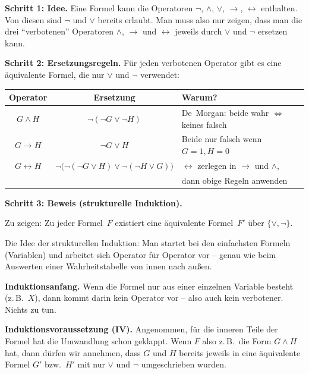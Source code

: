 \documentclass[a4paper,12pt]{article}
\begin{document}
\medskip
\textbf{Schritt 1: Idee.}
Eine Formel kann die Operatoren $\neg$, $\wedge$, $\vee$, $\to$,
$\leftrightarrow$ enthalten. Von diesen sind $\neg$ und $\vee$
bereits erlaubt. Man muss also nur zeigen, dass man die drei
``verbotenen'' Operatoren $\wedge$, $\to$ und $\leftrightarrow$
jeweils durch $\vee$ und $\neg$ ersetzen kann.

\medskip
\textbf{Schritt 2: Ersetzungsregeln.}
F\"ur jeden verbotenen Operator gibt es eine \"aquivalente Formel,
die nur $\vee$ und $\neg$ verwendet:

\begin{center}
\renewcommand{\arraystretch}{1.4}
\begin{tabular}{c|c|l}
\toprule
\textbf{Operator} & \textbf{Ersetzung} & \textbf{Warum?} \\
\midrule
$G \wedge H$
  & $\neg(\neg G \vee \neg H)$
  & De~Morgan: beide wahr $\Leftrightarrow$ keines falsch \\
$G \to H$
  & $\neg G \vee H$
  & Beide nur falsch wenn $G\!=\!1, H\!=\!0$ \\
$G \leftrightarrow H$
  & $\neg\bigl(\neg(\neg G \vee H) \vee \neg(\neg H \vee G)\bigr)$
  & $\leftrightarrow$ zerlegen in $\to$ und $\wedge$, \\
  & & dann obige Regeln anwenden \\
\bottomrule
\end{tabular}
\end{center}

\textbf{Schritt 3: Beweis (strukturelle Induktion).}

Zu zeigen: Zu jeder Formel~$F$ existiert eine \"aquivalente
Formel~$F'$ \"uber $\{\vee, \neg\}$.

Die Idee der strukturellen Induktion: Man startet bei den
einfachsten Formeln (Variablen) und arbeitet sich Operator f\"ur
Operator vor -- genau wie beim Auswerten einer Wahrheitstabelle
von innen nach au\ss en.

\medskip
\textbf{Induktionsanfang.}
Wenn die Formel nur aus einer einzelnen Variable besteht
(z.\,B.\ $X$), dann kommt darin kein Operator vor --
also auch kein verbotener. Nichts zu tun. \checkmark

\medskip
\textbf{Induktionsvoraussetzung (IV).}
Angenommen, f\"ur die inneren Teile der Formel hat die
Umwandlung schon geklappt. Wenn $F$ also z.\,B.\ die Form
$G \wedge H$ hat, dann d\"urfen wir annehmen, dass $G$ und $H$
bereits jeweils in eine \"aquivalente Formel $G'$ bzw.\ $H'$ mit
nur $\vee$ und $\neg$ umgeschrieben wurden.
\end{document}
